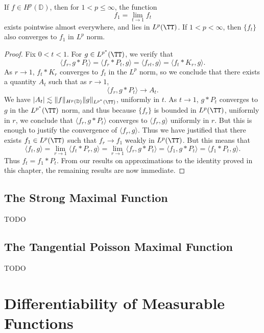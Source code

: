 \begin{theorem}
    If $f \in H^p(\mathbb{D})$, then for $1 < p \leq \infty$, the function
    \[ f_1 = \lim_{t \to 1} f_t \]
    exists pointwise almost everywhere, and lies in $L^p(\TT)$. If $1 < p < \infty$, then $\{ f_t \}$ also converges to $f_1$ in $L^p$ norm.
\end{theorem}
\begin{proof}
    Fix $0 < t < 1$. For $g \in L^{p^*}(\TT)$, we verify that
    \[ \langle f_r, g * P_t \rangle = \langle f_r * P_t, g \rangle = \langle f_{rt}, g \rangle = \langle f_t * K_r, g \rangle. \]
    As $r \to 1$, $f_t * K_r$ converges to $f_t$ in the $L^p$ norm, so we conclude that there exists a quantity $A_t$ such that as $r \to 1$,
    \[ \langle f_r, g * P_t \rangle \to A_t. \]
    We have $|A_t| \lesssim \| f \|_{H^p(\mathbb{D})} \| g \|_{L^{p^*}(\TT)}$, uniformly in $t$. As $t \to 1$, $g * P_t$ converges to $g$ in the $L^{p^*}(\TT)$ norm, and thus because $\{ f_r \}$ is bounded in $L^p(\TT)$, uniformly in $r$, we conclude that $\langle f_r, g * P_t \rangle$ converges to $\langle f_r, g \rangle$ uniformly in $r$. But this is enough to justify the convergence of $\langle f_r, g \rangle$. Thus we have justified that there exists $f_1 \in L^p(\TT)$ such that $f_r \to f_1$ weakly in $L^p(\TT)$. But this means that
    \[ \langle f_t, g \rangle = \lim_{r \to 1} \langle f_t * P_r, g \rangle = \lim_{r \to 1} \langle f_r, g * P_t \rangle = \langle f_1, g * P_t \rangle = \langle f_1 * P_t, g \rangle. \]
    Thus $f_t = f_1 * P_t$. From our results on approximations to the identity proved in this chapter, the remaining results are now immediate.
\end{proof}

\section{The Strong Maximal Function}

TODO

\section{The Tangential Poisson Maximal Function}

TODO

\chapter{Differentiability of Measurable Functions}


